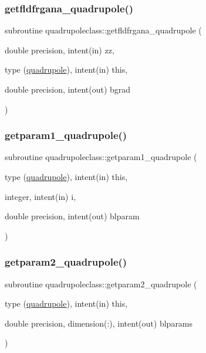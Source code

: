 \subsubsection{\texorpdfstring{getfldfrgana\_quadrupole()}{getfldfrgana\_quadrupole()}}
{\footnotesize\ttfamily subroutine quadrupoleclass\+::getfldfrgana\+\_\+quadrupole (\begin{DoxyParamCaption}\item[{double precision, intent(in)}]{zz,  }\item[{type (\mbox{\hyperlink{namespacequadrupoleclass_structquadrupoleclass_1_1quadrupole}{quadrupole}}), intent(in)}]{this,  }\item[{double precision, intent(out)}]{bgrad }\end{DoxyParamCaption})}

\mbox{\label{namespacequadrupoleclass_a48e1ded5cfc486c78a47d556fd008e29}} 
\subsubsection{\texorpdfstring{getparam1\_quadrupole()}{getparam1\_quadrupole()}}
{\footnotesize\ttfamily subroutine quadrupoleclass\+::getparam1\+\_\+quadrupole (\begin{DoxyParamCaption}\item[{type (\mbox{\hyperlink{namespacequadrupoleclass_structquadrupoleclass_1_1quadrupole}{quadrupole}}), intent(in)}]{this,  }\item[{integer, intent(in)}]{i,  }\item[{double precision, intent(out)}]{blparam }\end{DoxyParamCaption})}

\mbox{\label{namespacequadrupoleclass_a8991350fe610b73bca6787f4c528753c}} 
\subsubsection{\texorpdfstring{getparam2\_quadrupole()}{getparam2\_quadrupole()}}
{\footnotesize\ttfamily subroutine quadrupoleclass\+::getparam2\+\_\+quadrupole (\begin{DoxyParamCaption}\item[{type (\mbox{\hyperlink{namespacequadrupoleclass_structquadrupoleclass_1_1quadrupole}{quadrupole}}), intent(in)}]{this,  }\item[{double precision, dimension(\+:), intent(out)}]{blparams }\end{DoxyParamCaption})}

